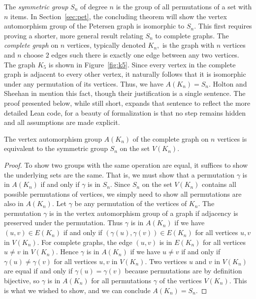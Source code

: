\documentclass{article}
\begin{document}
The \textit{symmetric group} $S_n$ of degree $n$ is the group of all permutations of a set with $n$ items. In Section~\ref{sec:pet}, the concluding theorem will show the vertex automorphism group of the Petersen graph is isomorphic to $S_n.$ This first requires proving a shorter, more general result relating $S_n$ to complete graphs. The \textit{complete graph} on $n$ vertices, typically denoted $K_n,$ is the graph with $n$ vertices and $n$ choose $2$ edges such there is exactly one edge between any two vertices. The graph $K_5$ is shown in Figure~\ref{fig:k5}. Since every vertex in the complete graph is adjacent to every other vertex, it naturally follows that it is isomorphic under any permutation of its vertices. Thus, we have $A(K_n) = S_n.$ Holton and Sheehan in \cite{holton} mention this fact, though their justification is a single sentence. The proof presented below, while still short, expands that sentence to reflect the more detailed Lean code, for a beauty of formalization is that no step remains hidden and all assumptions are made explicit.
\begin{lemma}\label{lem:autocomplete}
    The vertex automorphism group $A(K_n)$ of the complete graph on $n$ vertices is equivalent to the symmetric group $S_n$ on the set $V(K_n).$
\end{lemma}
\begin{proof}
    To show two groups with the same operation are equal, it suffices to show the underlying sets are the same. That is, we must show that a permutation $\gamma$ is in $A(K_n)$ if and only if $\gamma$ is in $S_n.$ Since $S_n$ on the set $V(K_n)$ contains all possible permutations of vertices, we simply need to show all permutations are also in $A(K_n).$ Let $\gamma$ be any permutation of the vertices of $K_n.$ The permutation $\gamma$ is in the vertex automorphism group of a graph if adjacency is preserved under the permutation. Thus $\gamma$ is in $A(K_n)$ if we have $(u, v) \in E(K_n)$ if and only if $(\gamma(u), \gamma(v)) \in E(K_n)$ for all vertices $u, v$ in $V(K_n).$ For complete graphs, the edge $(u, v)$ is in $E(K_n)$  for all vertices $u \neq v$ in $V(K_n).$ Hence $\gamma$ is in $A(K_n)$ if we have $u \neq v$ if and only if $\gamma(u) \neq \gamma(v)$ for all vertices $u, v$ in $V(K_n)$. Two vertices $u$ and $v$ in $V(K_n)$ are equal if and only if $\gamma(u) = \gamma(v)$ because permutations are by definition bijective, so $\gamma$ is in $A(K_n)$ for all permutations $\gamma$ of the vertices $V(K_n)$. This is what we wished to show, and we can conclude $A(K_n) = S_n$.
\end{proof}
\end{document}
